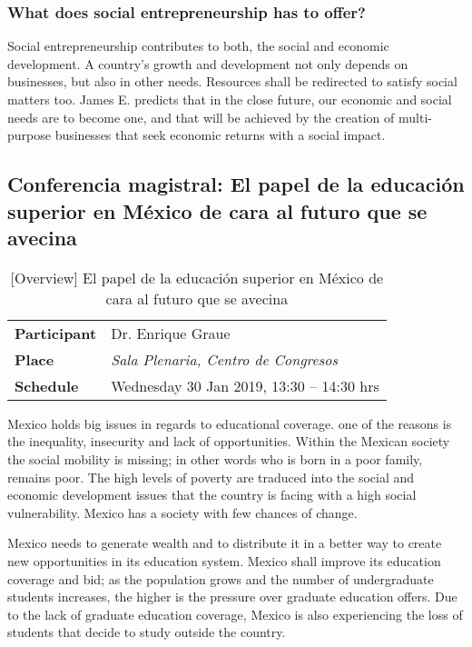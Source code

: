 \documentclass[11pt,a4paper]{article}
\begin{document}
\subsubsection*{What does social entrepreneurship has to offer?}
Social entrepreneurship contributes to both, the social and economic development. A country's growth and development not only depends on businesses, but also in other needs. Resources shall be redirected to satisfy social matters too. James E. predicts that in the close future, our economic and social needs are to become one, and that will be achieved by the creation of multi-purpose businesses that seek economic returns with a social impact.

\clearpage

\subsection{Conferencia magistral: El papel de la educación superior en México de cara al futuro que se avecina}\label{sec:conference1}

\parencite{Graue2019}
\begin{table}[h] %
\centering
\begin{tabular}{|l|l|}
\hline
\textbf{Participant} & Dr. Enrique Graue \\
\textbf{Place}       & \emph{Sala Plenaria, Centro de Congresos} \\
\textbf{Schedule}    & Wednesday 30 Jan 2019, 13:30 – 14:30 hrs \\
\hline
\end{tabular}
\caption{[Overview] El papel de la educación superior en México de cara al futuro que se avecina}\label{tab:table}
\end{table}

Mexico holds big issues in regards to educational coverage. one of the reasons is the inequality, insecurity and lack of opportunities. Within the Mexican society the social mobility is missing; in other words who is born in a poor family, remains poor. The high levels of poverty are traduced into the social and economic development issues that the country is facing with a high social vulnerability. Mexico has a society with few chances of change.

Mexico needs to generate wealth and to distribute it in a better way to create new opportunities in its education system. Mexico shall improve its education coverage and bid; as the population grows and the number of undergraduate students increases, the higher is the pressure over graduate education offers. Due to the lack of graduate education coverage, Mexico is also experiencing the loss of students that decide to study outside the country.
\end{document}
